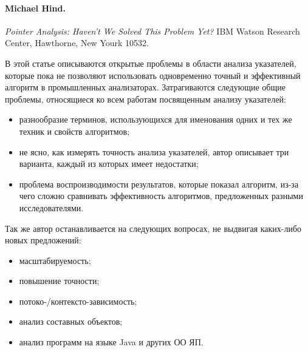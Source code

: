 \documentclass[12pt]{article}
\newcommand{\eng}[1]{{\English#1}}
\begin{document}
    \paragraph{Michael Hind.}
      \eng{
        \textit{Pointer Analysis: Haven't We Solved This Problem Yet?}
        IBM Watson Research Center, Hawthorne, New Yourk 10532.
      }

      В этой статье описываются открытые проблемы в области анализа указателей,
      которые пока не позволяют использовать одновременно точный и эффективный
      алгоритм в промышленных анализаторах.
      Затрагиваются следующие общие проблемы, относящиеся ко всем работам
      посвященным анализу указателей:
      \begin{itemize}
        \item разнообразие терминов, использующихся
          для именования одних и тех же техник и свойств алгоритмов;
        \item не ясно, как измерять точность анализа
          указателей, автор описывает три варианта, каждый из которых имеет
          недостатки;
        \item проблема воспроизводимости результатов, которые показал алгоритм,
          из-за чего сложно сравнивать эффективность алгоритмов, предложенных
          разными исследователями.
      \end{itemize}

      Так же автор останавливается на следующих вопросах, не выдвигая
      каких-либо новых предложений:
      \begin{itemize}
        \item масштабируемость;
        \item повышение точности;
        \item потоко-/контексто-зависимость;
        \item анализ составных объектов;
        \item анализ программ на языке Java и других ОО ЯП.
      \end{itemize}
\end{document}
